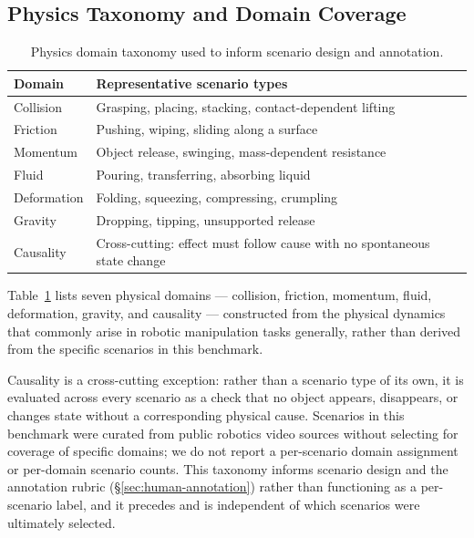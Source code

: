 \documentclass{article} %
\begin{document}
\subsection{Physics Taxonomy and Domain Coverage}
\begin{table}
\vspace{-12pt}
\centering
\caption{Physics domain taxonomy used to inform scenario design and annotation.}
\label{tab:taxonomy}
\footnotesize
\setlength{\tabcolsep}{3.5pt}
\begin{tabular}{@{}p{1.8cm}>{\raggedright\arraybackslash}p{4.95cm}@{}}
\toprule
Domain & Representative scenario types \\
\midrule
Collision    & Grasping, placing, stacking, contact-dependent lifting \\
Friction     & Pushing, wiping, sliding along a surface \\
Momentum     & Object release, swinging, mass-dependent resistance \\
Fluid        & Pouring, transferring, absorbing liquid \\
Deformation  & Folding, squeezing, compressing, crumpling \\
Gravity      & Dropping, tipping, unsupported release \\
Causality    & Cross-cutting: effect must follow cause with no spontaneous state change \\
\bottomrule
\end{tabular}
\vspace{-10pt}
\end{table}
Table~\ref{tab:taxonomy} lists seven physical domains --- collision,
friction, momentum, fluid, deformation, gravity, and causality ---
constructed from the physical dynamics that commonly arise in
robotic manipulation tasks generally, rather than derived from the
specific scenarios in this benchmark.

Causality is a cross-cutting exception: rather than a scenario type
of its own, it is evaluated across every scenario as a check that no
object appears, disappears, or changes state without a corresponding
physical cause. Scenarios in this benchmark were curated from public
robotics video sources without selecting for coverage of specific
domains; we do not report a per-scenario domain assignment or
per-domain scenario counts. This taxonomy informs scenario design
and the annotation rubric (\S\ref{sec:human-annotation}) rather than
functioning as a per-scenario label, and it precedes and is
independent of which scenarios were ultimately selected.
\end{document}
